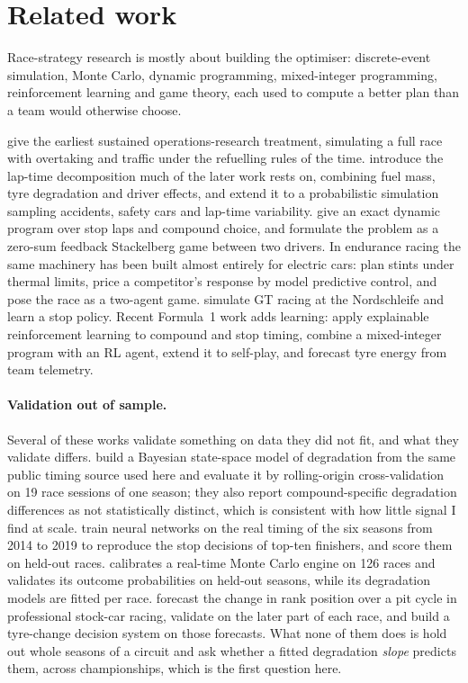 \documentclass[11pt,a4paper]{article}
\begin{document}
\section{Related work}

Race-strategy research is mostly about building the optimiser: discrete-event
simulation, Monte Carlo, dynamic programming, mixed-integer programming,
reinforcement learning and game theory, each used to compute a better plan than a
team would otherwise choose.

\citet{bekker2009} give the earliest sustained operations-research treatment,
simulating a full race with overtaking and traffic under the refuelling rules of
the time. \citet{heilmeier2018} introduce the lap-time decomposition much of the
later work rests on, combining fuel mass, tyre degradation and driver effects,
and \citet{heilmeier2020mc} extend it to a probabilistic simulation sampling
accidents, safety cars and lap-time variability. \citet{carrasco2022} give an
exact dynamic program over stop laps and compound choice, and \citet{aguad2024}
formulate the problem as a zero-sum feedback Stackelberg game between two
drivers. In endurance racing the same machinery has been built almost entirely
for electric cars: \citet{vankampen2022} plan stints under thermal limits,
\citet{vankampen2024} price a competitor's response by model predictive control,
and \citet{devries2026} pose the race as a two-agent game.
\citet{boettinger2023} simulate GT racing at the Nordschleife and learn a stop
policy. Recent Formula~1 work adds learning: \citet{thomas2025} apply
explainable reinforcement learning to compound and stop timing,
\citet{fieni2025} combine a mixed-integer program with an RL agent,
\citet{fieni2026} extend it to self-play, and \citet{todd2025} forecast tyre
energy from team telemetry.

\paragraph{Validation out of sample.} Several of these works validate something
on data they did not fit, and what they validate differs.
\citet{cappello2026} build a Bayesian state-space model of degradation from the
same public timing source used here and evaluate it by rolling-origin
cross-validation on 19 race sessions of one season; they also report
compound-specific degradation differences as not statistically distinct, which
is consistent with how little signal I find at scale. \citet{heilmeier2020nn}
train neural networks on the real timing of the six seasons from 2014 to 2019
to reproduce the stop decisions of top-ten finishers, and score them on held-out
races. \citet{santillana2026} calibrates a real-time Monte Carlo engine on 126
races and validates its outcome probabilities on held-out seasons, while its
degradation models are fitted per race. \citet{tulabandhula2014} forecast the
change in rank position over a pit cycle in professional stock-car racing,
validate on the later part of each race, and build a tyre-change decision
system on those forecasts. What none of them does is hold out whole seasons of a
circuit and ask whether a fitted degradation \emph{slope} predicts them, across
championships, which is the first question here.
\end{document}

